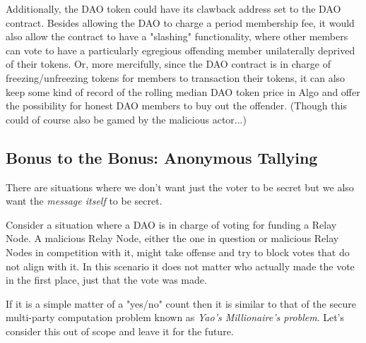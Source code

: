 \documentclass[9pt]{article}
\begin{document}
Additionally, the DAO token could have its clawback address set to the DAO contract. Besides allowing the DAO to charge a period membership fee, it would also allow the contract to have a "slashing" functionality, where other members can vote to have a particularly egregious offending member unilaterally deprived of their tokens. Or, more mercifully, since the DAO contract is in charge of freezing/unfreezing tokens for members to transaction their tokens, it can also keep some kind of record of the rolling median DAO token price in Algo and offer the possibility for honest DAO members to buy out the offender. (Though this could of course also be gamed by the malicious actor...)

\subsection{Bonus to the Bonus: Anonymous Tallying}

There are situations where we don't want just the voter to be secret but we also want the \textit{message itself} to be secret.

Consider a situation where a DAO is in charge of voting for funding a Relay Node. A malicious Relay Node, either the one in question or malicious Relay Nodes in competition with it, might take offense and try to block votes that do not align with it. In this scenario it does not matter who actually made the vote in the first place, just that the vote was made.

If it is a simple matter of a "yes/no" count then it is similar to that of the secure multi-party computation problem known as \textit{Yao's Millionaire's problem}. Let's consider this out of scope and leave it for the future.
\end{document}
